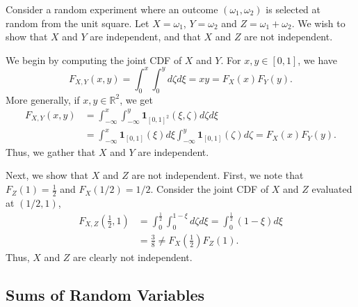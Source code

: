 \begin{example}
Consider a random experiment where an outcome $(\omega_1, \omega_2)$ is selected at random from the unit square.
Let $X = \omega_1$, $Y = \omega_2$ and $Z = \omega_1 + \omega_2$.
We wish to show that $X$ and $Y$ are independent, and that $X$ and $Z$ are not independent.

We begin by computing the joint CDF of $X$ and $Y$.
For $x,y \in [0,1]$, we have
\begin{equation*}
F_{X,Y}(x,y) = \int_0^{x} \int_0^{y} d\zeta d\xi
= x y = F_X(x) F_Y(y) .
\end{equation*}
More generally, if $x, y \in \mathbb{R}^2$, we get
\begin{equation*}
\begin{split}
F_{X,Y}(x,y)
&= \int_{-\infty}^{x} \int_{-\infty}^{y}
\mathbf{1}_{[0,1]^2} (\xi, \zeta) d\zeta d\xi \\
&= \int_{-\infty}^{x} \mathbf{1}_{[0,1]} (\xi) d \xi
\int_{-\infty}^{y} \mathbf{1}_{[0,1]} (\zeta) d\zeta
= F_X(x) F_Y(y) .
\end{split}
\end{equation*}
Thus, we gather that $X$ and $Y$ are independent.

Next, we show that $X$ and $Z$ are not independent.
First, we note that $F_Z (1) = \frac{1}{2}$ and $F_X (1/2) = 1/2$.
Consider the joint CDF of $X$ and $Z$ evaluated at $(1/2, 1)$,
\begin{equation*}
\begin{split}
F_{X,Z} \left( \frac{1}{2} ,1 \right)
&= \int_{0}^{\frac{1}{2}} \int_{0}^{1-\xi} d\zeta d\xi
= \int_{0}^{\frac{1}{2}} (1 - \xi) d\xi \\
&= \frac{3}{8}
\neq F_X \left( \frac{1}{2} \right) F_Z(1) .
\end{split}
\end{equation*}
Thus, $X$ and $Z$ are clearly not independent.
\end{example}


\subsection{Sums of Random Variables}

